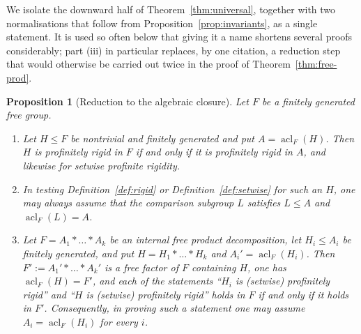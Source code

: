 \documentclass[11pt]{amsart}
\theoremstyle{plain}
\newtheorem{proposition}[theorem]{Proposition}
\theoremstyle{definition}
\newcommand{\acl}{\operatorname{acl}}
\begin{document}
We isolate the downward half of Theorem~\ref{thm:universal}, together with two
normalisations that follow from Proposition~\ref{prop:invariants}, as a single
statement.  It is used so often below that giving it a name shortens several
proofs considerably; part (iii) in particular replaces, by one citation, a
reduction step that would otherwise be carried out twice in the proof of
Theorem~\ref{thm:free-prod}.

\begin{proposition}[Reduction to the algebraic closure]\label{prop:reduce}
Let $F$ be a finitely generated free group.
\begin{enumerate}
\item[(i)] Let $H\le F$ be nontrivial and finitely generated and put
  $A=\acl_F(H)$.  Then $H$ is profinitely rigid in $F$ if and only if it is
  profinitely rigid in $A$, and likewise for setwise profinite rigidity.
\item[(ii)] In testing Definition~\ref{def:rigid} or Definition~\ref{def:setwise}
  for such an $H$, one may always assume that the comparison subgroup $L$
  satisfies $L\le A$ and $\acl_F(L)=A$.
\item[(iii)] Let $F=A_1*\dots*A_k$ be an internal free product decomposition, let
  $H_i\le A_i$ be finitely generated, and put $H=H_1*\dots*H_k$ and
  $A_i'=\acl_F(H_i)$.  Then $F':=A_1'*\dots*A_k'$ is a free factor of $F$
  containing $H$, one has $\acl_F(H)=F'$, and each of the statements
  ``$H_i$ is (setwise) profinitely rigid'' and ``$H$ is (setwise) profinitely
  rigid'' holds in $F$ if and only if it holds in $F'$.  Consequently, in proving
  such a statement one may assume $A_i=\acl_F(H_i)$ for every $i$.
\end{enumerate}
\end{proposition}
\end{document}
